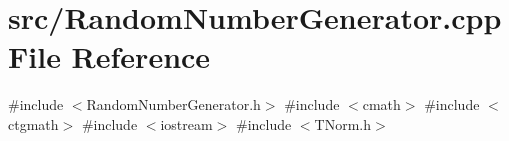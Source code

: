 \section{src/\+Random\+Number\+Generator.cpp File Reference}
\label{_random_number_generator_8cpp}
{\ttfamily \#include $<$Random\+Number\+Generator.\+h$>$}\newline
{\ttfamily \#include $<$cmath$>$}\newline
{\ttfamily \#include $<$ctgmath$>$}\newline
{\ttfamily \#include $<$iostream$>$}\newline
{\ttfamily \#include $<$T\+Norm.\+h$>$}\newline
